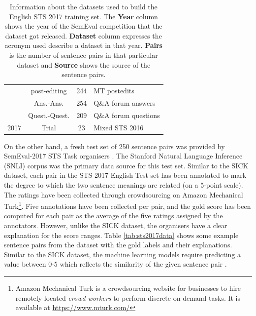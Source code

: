 \begin{enumerate}
\begin{table}[ht!]
\begin{tabular}{c|c|c|l}
 		& post-editing & 244 & MT postedits \\
 		 & Ans.-Ans. & 254 & Q\&A forum answers \\
 		 & Quest.-Quest. & 209 & Q\&A forum questions \\
 		\hline
 		\makecell{2017 \\ \autocite{cer-etal-2017-semeval}} & Trial & 23 & Mixed STS 2016 \\
 		\hline
 	\end{tabular}
 	\caption[Information about English STS 2017 training set]{Information about the datasets used to build the English STS 2017 training set. The \textbf{Year} column shows the year of the SemEval competition that the dataset got released. \textbf{Dataset} column expresses the acronym used describe a dataset in that year. \textbf{Pairs} is the number of sentence pairs in that particular dataset and \textbf{Source} shows the source of the sentence pairs. }
 	\label{tab:englishdata_info}
 \end{table}

On the other hand, a fresh test set of 250 sentence pairs was provided by SemEval-2017 STS Task organisers \autocite{cer-etal-2017-semeval}. The Stanford Natural Language Inference (SNLI) corpus \autocite{bowman-etal-2015-large} was the primary data source for this test set. Similar to the SICK dataset, each pair in the STS 2017 English Test set has been annotated to mark the degree to which the two sentence meanings are related (on a 5-point scale). The ratings have been collected through crowdsourcing on Amazon Mechanical Turk\footnote{Amazon Mechanical Turk is a crowdsourcing website for businesses to hire remotely located \textit{crowd workers} to perform discrete on-demand tasks. It is available at \url{https://www.mturk.com/}}. Five annotations have been collected per pair, and the gold score has been computed for each pair as the average of the five ratings assigned by the annotators. However, unlike the SICK dataset, the organisers have a clear explanation for the score ranges. Table \ref{tab:sts2017data} shows some example sentence pairs from the dataset with the gold labels and their explanations. Similar to the SICK dataset, the machine learning models require predicting a value between 0-5 which reflects the similarity of the given sentence pair \autocite{cer-etal-2017-semeval}.


\end{enumerate}

